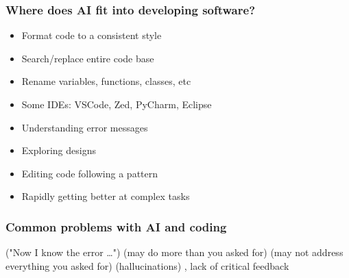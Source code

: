 \documentclass[aspectratio=169,hyperref=colorlinks]{beamer}
\begin{document}
\begin{frame}
  \frametitle{Where does AI fit into developing software?}
  \summary{}

  \begin{itemize}
    \begin{itemize}
    \item Format code to a consistent style
    \item Search/replace entire code base
    \item Rename variables, functions, classes, etc
    \item Some IDEs: VSCode, Zed, PyCharm, Eclipse
    \end{itemize}
    \begin{itemize}
    \item Understanding error messages
    \item Exploring designs
    \end{itemize}
    \begin{itemize}
    \item Editing code following a pattern
    \item Rapidly getting better at complex tasks
    \end{itemize}
  \end{itemize}

\end{frame}


\begin{frame}
  \frametitle{Common problems with AI and coding}
  \summary{}

  \begin{itemize}
   ("Now I know the error \ldots")
   (may do more than you asked for)
   (may not address everything you asked for)
   (hallucinations)
  , lack of critical feedback
  \end{itemize}

\end{frame}
\end{document}
